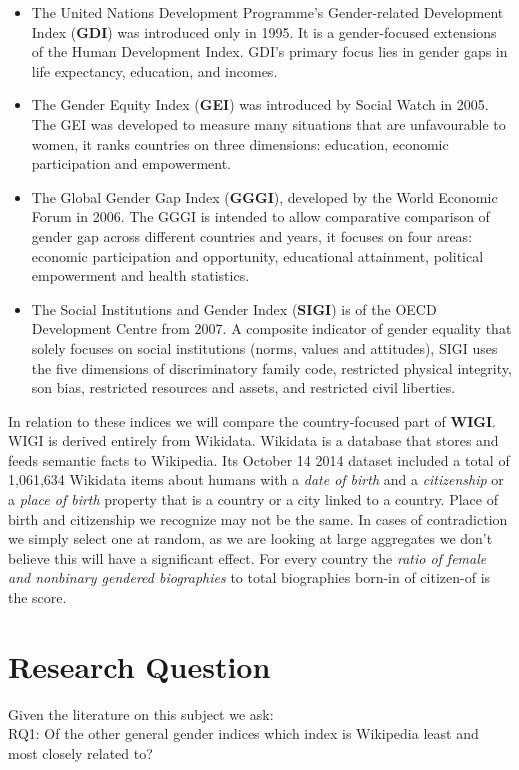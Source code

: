 \documentclass{sig-alternate}
\begin{document}
\begin{itemize}
\item The United Nations Development Programme's Gender-related Development Index (\textbf{GDI}) was introduced only in 1995. It is a gender-focused extensions of the Human Development Index. GDI's primary focus lies in gender gaps in life expectancy, education, and incomes.
\item The Gender Equity Index (\textbf{GEI}) was introduced by Social Watch in 2005.  The GEI was developed to measure many situations that are unfavourable to women, it ranks countries on three dimensions: education, economic participation and empowerment.
\item The Global Gender Gap Index (\textbf{GGGI}), developed by the World Economic Forum in 2006. The GGGI is intended to allow comparative comparison of gender gap across different countries and years, it focuses on four areas:  economic participation and opportunity, educational attainment, political empowerment and health statistics.
\item The Social Institutions and Gender Index (\textbf{SIGI}) is of the OECD Development Centre from 2007. A composite indicator of gender equality that solely focuses on social institutions (norms, values and attitudes), SIGI uses the five dimensions of discriminatory family code, restricted physical integrity, son bias, restricted resources and assets, and restricted civil liberties.
\end{itemize}

In relation to these indices we will compare the country-focused part of \textbf{WIGI}. WIGI is derived entirely from Wikidata. Wikidata is a database that stores and feeds semantic facts to Wikipedia. Its October 14 2014 dataset included a total of 1,061,634 Wikidata items about humans with a \textit{date of birth} and a \textit{citizenship} or a \textit{place of birth} property that is a country or a city linked to a country. Place of birth and citizenship we recognize may not be the same. In cases of contradiction we simply select one at random, as we are looking at large aggregates we don't believe this will have a significant effect. For every country the \textit{ratio of female and nonbinary gendered biographies} to total biographies born-in of citizen-of is the score\cite{klein:wigi}.  

\section{Research Question}
Given the literature on this subject we ask:\\
RQ1: Of the other general gender indices which index is Wikipedia least and most closely related to?
\end{document}
